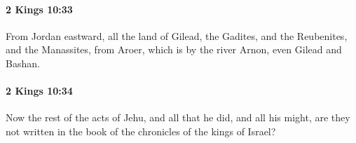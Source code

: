 		\paragraph{2 Kings 10:33} %
			\label{2KINGS-10-33}

			From Jordan eastward, all the land of Gilead, the Gadites, and the Reubenites, and the Manassites, from Aroer, which is by the river Arnon, even Gilead and Bashan.


		\paragraph{2 Kings 10:34} %
			\label{2KINGS-10-34}

			Now the rest of the acts of Jehu, and all that he did, and all his might, are they not written in the book of the chronicles of the kings of Israel?


